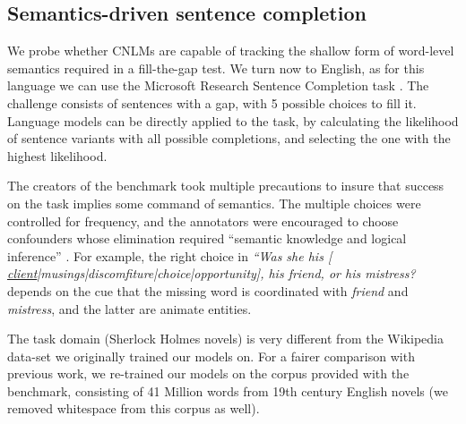 \subsection{Semantics-driven sentence completion}
\label{sec:semantics}

We probe whether CNLMs are capable of tracking the shallow
form of word-level semantics required in a fill-the-gap test. We turn now to English, as for this language we can use the Microsoft
Research Sentence Completion task \cite{Zweig:Burges:2011}. The
challenge consists of sentences with a gap, with 5 possible
choices to fill it. Language models can be
directly applied to the task, by calculating the likelihood of sentence
variants with all possible completions, and selecting the one with the
highest likelihood.

The creators of the benchmark took multiple precautions to insure that
success on the task implies some command of semantics. The multiple
choices were controlled for frequency, and the annotators were
encouraged to choose confounders whose elimination required ``semantic
knowledge and logical inference'' \cite{Zweig:Burges:2011}.  For
example, the right choice in \emph{``Was she his [
  \underline{client}|musings|discomfiture|choice|opportunity], his
  friend, or his mistress?} depends on the cue that the missing word is
coordinated with \emph{friend} and \emph{mistress}, and the
latter are animate entities.

The task domain (Sherlock Holmes novels) is very different
from the Wikipedia data-set we originally trained our models on. For a
fairer comparison with previous work, we re-trained our models on
the corpus provided with the benchmark, consisting of
41 Million words from 19th century English novels (we removed
whitespace from this corpus as well).

